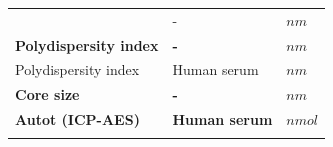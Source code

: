 \documentclass[utf8]{frontiersHLTH} %
\begin{document}
\begin{longtable}[]{@{}lll@{}}
\begin{minipage}[t]{0.58\columnwidth}
\end{minipage} & \begin{minipage}[t]{0.20\columnwidth}\raggedright\strut
-\strut
\end{minipage} & \begin{minipage}[t]{0.13\columnwidth}\raggedright\strut
\(nm\)\strut
\end{minipage}\tabularnewline
\begin{minipage}[t]{0.58\columnwidth}\raggedright\strut
\textbf{Polydispersity index}\strut
\end{minipage} & \begin{minipage}[t]{0.20\columnwidth}\raggedright\strut
\textbf{-}\strut
\end{minipage} & \begin{minipage}[t]{0.13\columnwidth}\raggedright\strut
\(nm\)\strut
\end{minipage}\tabularnewline
\begin{minipage}[t]{0.58\columnwidth}\raggedright\strut
Polydispersity index\strut
\end{minipage} & \begin{minipage}[t]{0.20\columnwidth}\raggedright\strut
Human serum\strut
\end{minipage} & \begin{minipage}[t]{0.13\columnwidth}\raggedright\strut
\(nm\)\strut
\end{minipage}\tabularnewline
\begin{minipage}[t]{0.58\columnwidth}\raggedright\strut
\textbf{Core size}\strut
\end{minipage} & \begin{minipage}[t]{0.20\columnwidth}\raggedright\strut
\textbf{-}\strut
\end{minipage} & \begin{minipage}[t]{0.13\columnwidth}\raggedright\strut
\(nm\)\strut
\end{minipage}\tabularnewline
\begin{minipage}[t]{0.58\columnwidth}\raggedright\strut
\textbf{Autot (ICP-AES)}\strut
\end{minipage} & \begin{minipage}[t]{0.20\columnwidth}\raggedright\strut
\textbf{Human serum}\strut
\end{minipage} & \begin{minipage}[t]{0.13\columnwidth}\raggedright\strut
\(nmol\)\strut
\end{minipage}\tabularnewline
\begin{minipage}[t]{0.58\columnwidth}\raggedright\strut

\end{minipage}
\end{longtable}
\end{document}
